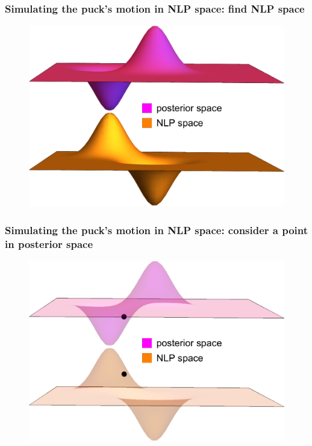 \documentclass[handout]{beamer}
\begin{document}
\begin{frame}
	\frametitle{Simulating the puck's motion in NLP space: find NLP space}
	
	\begin{figure}[ht]
		\centerline{\includegraphics[width=1\textwidth]{animations_figures/lec5_nlpPosterior1.pdf}}
	\end{figure}
	
\end{frame}

\begin{frame}
	\frametitle{Simulating the puck's motion in NLP space: consider a point in posterior space}
	
	\begin{figure}[ht]
		\centerline{\includegraphics[width=1\textwidth]{animations_figures/lec5_nlpPosterior2.pdf}}
	\end{figure}
	
\end{frame}
\end{document}
